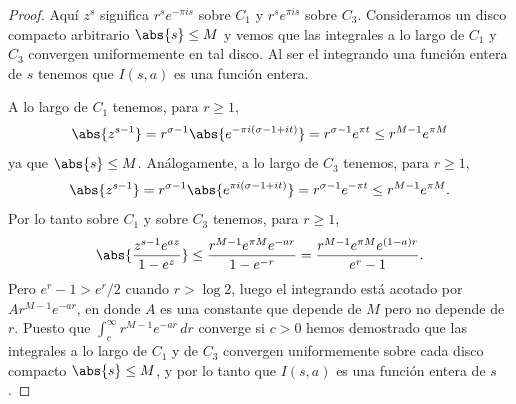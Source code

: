 \documentclass[12pt,a4paper]{book}
\begin{document}
    \begin{proof}
        Aquí $z^{s}$ significa $r^{s}e^{-\pi is}$ sobre $C_{1}$ y $r^{s}e^{\pi is}$ sobre $C_{3}$.
        Consideramos un disco compacto arbitrario $\abs{s}\leq M$ y vemos que las integrales a
        lo largo de $C_{1}$ y $C_{3}$ convergen uniformemente en tal disco. Al ser el integrando
        una función entera de $s$ tenemos que $I(s,a)$ es una función entera.

        A lo largo de $C_{1}$ tenemos, para $r\geq1$,
        \begin{equation*}
            \abs{z^{s-1}}=r^{\sigma-1}\abs{e^{-\pi i(\sigma-1+it)}}=r^{\sigma-1}e^{\pi t}\leq r^{M-1}e^{\pi M}
        \end{equation*}
        ya que $\abs{s}\leq M$. Análogamente, a lo largo de $C_{3}$ tenemos, para $r\geq1$,
        \begin{equation*}
            \abs{z^{s-1}}=r^{\sigma-1}\abs{e^{\pi i(\sigma-1+it)}}=r^{\sigma-1}e^{-\pi t}\leq r^{M-1}e^{\pi M}.
        \end{equation*}
        Por lo tanto sobre $C_{1}$ y sobre $C_{3}$ tenemos, para $r\geq1$,
        \begin{equation*}
            \abs{\frac{z^{s-1}e^{az}}{1-e^{z}}}\leq\frac{r^{M-1}e^{\pi M}e^{-ar}}{1-e^{-r}}=\frac{r^{M-1}e^{\pi M}e^{(1-a)r}}{e^{r}-1}.
        \end{equation*}
        Pero $e^{r}-1>e^{r}/2$ cuando $r>\log2$, luego el integrando está acotado por
        $Ar^{M-1}e^{-ar}$, en donde $A$ es una constante que depende de $M$ pero no depende de
        $r$. Puesto que $\int_{c}^{\infty}r^{M-1}e^{-ar}\,dr$ converge si $c>0$ hemos demostrado
        que las integrales a lo largo de $C_{1}$ y de $C_{3}$ convergen uniformemente sobre cada
        disco compacto $\abs{s}\leq M$, y por lo tanto que $I(s,a)$ es una función entera de
        $s$.


\end{proof}
\end{document}
